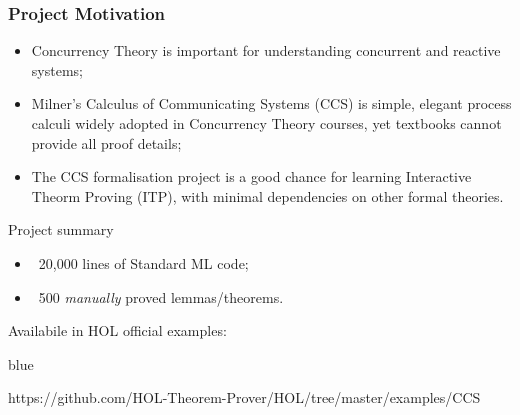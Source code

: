 




\begin{frame}[fragile]\frametitle{Project Motivation}
\begin{itemize}
\item Concurrency Theory is important 
  for understanding concurrent and reactive systems;
\item Milner's Calculus of Communicating Systems (CCS) is
  simple, elegant process calculi widely adopted in Concurrency Theory courses, yet textbooks
  cannot provide all proof details;
\item The CCS formalisation project is a good chance for learning Interactive Theorm
  Proving (ITP), with minimal dependencies on other formal theories.
\end{itemize}
\begin{block}{Project summary}
\begin{itemize}
\item ~20,000 lines of Standard ML code;
\item ~500 \emph{manually} proved lemmas/theorems.
\end{itemize}
Availabile in HOL official examples:
\begin{color}{blue}
\begin{texttt}
https://github.com/HOL-Theorem-Prover/HOL/tree/master/examples/CCS
\end{texttt}
\end{color}
\end{block}
\end{frame}

